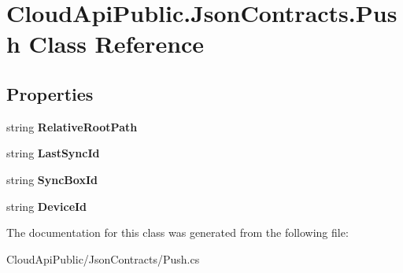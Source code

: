 \hypertarget{class_cloud_api_public_1_1_json_contracts_1_1_push}{\section{Cloud\-Api\-Public.\-Json\-Contracts.\-Push Class Reference}
\label{class_cloud_api_public_1_1_json_contracts_1_1_push}
}
\subsection*{Properties}
\begin{DoxyCompactItemize}
\item 
\hypertarget{class_cloud_api_public_1_1_json_contracts_1_1_push_a31731207c67d351e0c1469e7d18cedf3}{string {\bfseries Relative\-Root\-Path}}\label{class_cloud_api_public_1_1_json_contracts_1_1_push_a31731207c67d351e0c1469e7d18cedf3}

\item 
\hypertarget{class_cloud_api_public_1_1_json_contracts_1_1_push_a3dbd61ad7aed156fc82dad9b9e2dd593}{string {\bfseries Last\-Sync\-Id}}\label{class_cloud_api_public_1_1_json_contracts_1_1_push_a3dbd61ad7aed156fc82dad9b9e2dd593}

\item 
\hypertarget{class_cloud_api_public_1_1_json_contracts_1_1_push_ac1a194c979e7cb46fe642c1693527a72}{string {\bfseries Sync\-Box\-Id}}\label{class_cloud_api_public_1_1_json_contracts_1_1_push_ac1a194c979e7cb46fe642c1693527a72}

\item 
\hypertarget{class_cloud_api_public_1_1_json_contracts_1_1_push_aba02413f792a4a1f81c167a33f4300c3}{string {\bfseries Device\-Id}}\label{class_cloud_api_public_1_1_json_contracts_1_1_push_aba02413f792a4a1f81c167a33f4300c3}

\end{DoxyCompactItemize}


The documentation for this class was generated from the following file\-:\begin{DoxyCompactItemize}
\item 
Cloud\-Api\-Public/\-Json\-Contracts/Push.\-cs\end{DoxyCompactItemize}
